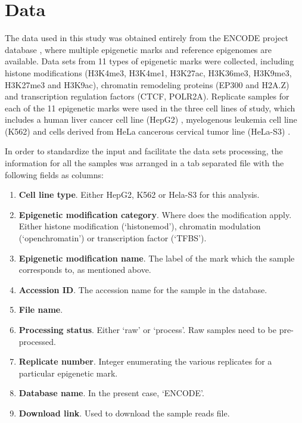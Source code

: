 \section{Data}\label{data}

The data used in this study was obtained entirely from the ENCODE project database \cite{Feingold2004}, where multiple epigenetic marks and reference epigenomes are available. Data sets from 11 types of epigenetic marks were collected, including histone modifications (H3K4me3, H3K4me1, H3K27ac, H3K36me3, H3K9me3, H3K27me3 and H3K9ac), chromatin remodeling proteins (EP300 and H2A.Z) and transcription regulation factors (CTCF, POLR2A). Replicate samples for each of the 11 epigenetic marks were used in the three cell lines of study, which includes a human liver cancer cell line (HepG2) \cite{Aden1979}, myelogenous leukemia cell line (K562) \cite{Andersson1979} and cells derived from HeLa cancerous cervical tumor line (HeLa-S3) \cite{Douglas1973,Chen2008}.

\medskip

In order to standardize the input and facilitate the data sets processing, the information for all the samples was arranged in a tab separated file with the following fields as columns:

\begin{enumerate}
    \item \textbf{Cell line type}. Either HepG2, K562 or Hela-S3 for this analysis.
    \item \textbf{Epigenetic modification category}. Where does the modification apply. Either histone modification (`histonemod'), chromatin modulation (`openchromatin') or transcription factor (`TFBS').
    \item \textbf{Epigenetic modification name}. The label of the mark which the sample corresponds to, as mentioned above.
    \item \textbf{Accession ID}. The accession name for the sample in the database.
    \item \textbf{File name}.
    \item \textbf{Processing status}. Either `raw' or `process'. Raw samples need to be pre-processed.
    \item \textbf{Replicate number}. Integer enumerating the various replicates for a particular epigenetic mark.
    \item \textbf{Database name}. In the present case, `ENCODE'.
    \item \textbf{Download link}. Used to download the sample reads file.
\end{enumerate}

